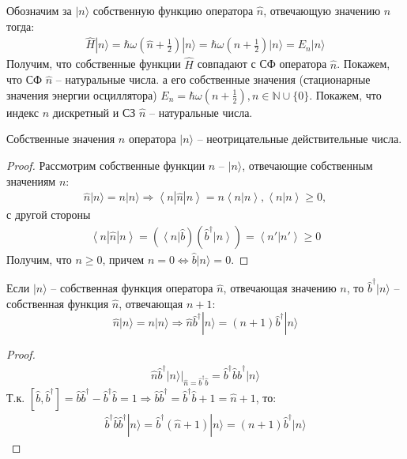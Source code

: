 \documentclass[__main__.tex]{subfiles}
\begin{document}
	Обозначим за $|n\rangle$ собственную функцию оператора $\hat{n}$, отвечающую значению $n$ тогда:
	\begin{gather*}
	\hat{H}|n\rangle
	=
	\hbar\omega\left(\hat{n}+\frac{1}{2}\right)|n\rangle
	=
	\hbar\omega\left(n+\frac{1}{2}\right)|n\rangle
	=
	E_n|n\rangle
	\end{gather*}
	Получим, что собственные функции $\hat{H}$ совпадают с СФ оператора $\hat{n}$. Покажем, что СФ $\hat{n}$ -- натуральные числа. а его собственные значения (стационарные значения энергии осциллятора) $E_n=\hbar\omega\left(n+\frac{1}{2}\right),n\in\mathbb{N}\cup\{0\}$. Покажем, что индекс $n$ дискретный и СЗ $\hat{n}$ -- натуральные числа.
	
	\begin{theorem}
		Собственные значения $n$ оператора $|n\rangle$ -- неотрицательные действительные числа.
	\end{theorem}
	\begin{proof}
		Рассмотрим собственные функции $\hat{n}$ -- $|n\rangle$, отвечающие собственным значениям $n$:
		\begin{gather*}
		\hat{n}|n\rangle = n|n\rangle
		\Longrightarrow
		\left< n| \hat{n}|n\right> = n \left<n|n\right>, \left<n|n\right> \ge 0,
		\end{gather*}
		с другой стороны
		\begin{gather*}
		\left< n| \hat{n}|n\right> = (\left< n\right|\hat{b})(\hat{b}^\dagger\left|n\right>) =
		\left< n'|n'\right> \ge 0
		\end{gather*}
		Получим, что $n\ge 0$, причем $n=0\Leftrightarrow \hat{b}|n\rangle = 0$.
	\end{proof}
	\begin{theorem}
		Если $|n\rangle$ -- собственная функция оператора $\hat{n}$, отвечающая значению $n$, то $\hat{b}^\dagger|n\rangle$ -- собственная функция $\hat{n}$, отвечающая $n+1$:
		$$
		\hat{n}|n\rangle=n|n\rangle\Longrightarrow\hat{n}\hat{b}^\dagger|n\rangle=(n+1)\hat{b}^\dagger|n\rangle
		$$
		\llabel{_10:th-seq}
	\end{theorem}
	\begin{proof}
		\begin{gather*}
		\hat{n}\hat{b}^\dagger|n\rangle
		|_{\hat{n}=\hat{b}^\dagger\hat{b}}
		=
		\hat{b}^\dagger\hat{b}\hat{b}^\dagger|n\rangle
		\end{gather*}
		Т.к. $[\hat{b},\hat{b}^\dagger]=\hat{b}\hat{b}^\dagger-\hat{b}^\dagger\hat{b}=1\Longrightarrow\hat{b}\hat{b}^\dagger=\hat{b}^\dagger\hat{b}+1=\hat{n}+1$, то:
		\begin{gather*}
		\hat{b}^\dagger\hat{b}\hat{b}^\dagger|n\rangle
		=
		\hat{b}^\dagger(\hat{n}+1)|n\rangle
		=
		(n+1)\hat{b}^\dagger|n\rangle
		\end{gather*}
	\end{proof}
\end{document}
